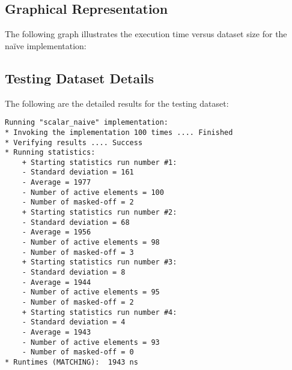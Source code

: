 \documentclass[12pt]{article}
\begin{document}
\subsection{Graphical Representation}
The following graph illustrates the execution time versus dataset size for the naïve implementation:

    
\subsection{Testing Dataset Details}
The following are the detailed results for the testing dataset:
\begin{lstlisting}[caption=Testing Dataset Execution Details, style=customc]
Running "scalar_naive" implementation:
* Invoking the implementation 100 times .... Finished
* Verifying results .... Success
* Running statistics:
    + Starting statistics run number #1:
    - Standard deviation = 161
    - Average = 1977
    - Number of active elements = 100
    - Number of masked-off = 2
    + Starting statistics run number #2:
    - Standard deviation = 68
    - Average = 1956
    - Number of active elements = 98
    - Number of masked-off = 3
    + Starting statistics run number #3:
    - Standard deviation = 8
    - Average = 1944
    - Number of active elements = 95
    - Number of masked-off = 2
    + Starting statistics run number #4:
    - Standard deviation = 4
    - Average = 1943
    - Number of active elements = 93
    - Number of masked-off = 0
* Runtimes (MATCHING):  1943 ns
\end{lstlisting}
\end{document}
